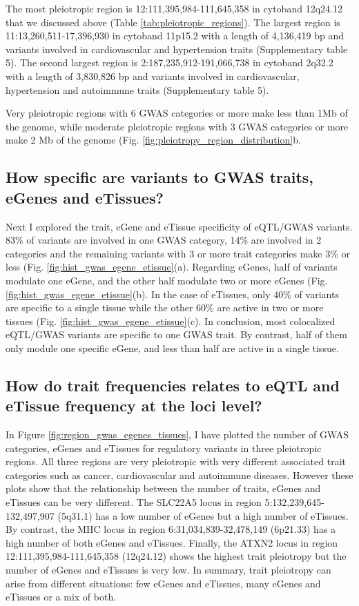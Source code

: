 The most pleiotropic region is 12:111,395,984-111,645,358 in cytoband 12q24.12 that we discussed above (Table \ref{tab:pleiotropic_regions}).
%
The largest region is 11:13,260,511-17,396,930 in cytoband 11p15.2 with a length of 4,136,419 bp and variants involved in cardiovascular and hypertension traits (Supplementary table 5).
%
The second largest region is 2:187,235,912-191,066,738 in cytoband 2q32.2 with a length of 3,830,826 bp and variants involved in cardiovascular, hypertension and autoimmune traits  (Supplementary table 5).

Very pleiotropic regions with 6 GWAS categories or more make less than 1Mb of the genome, while moderate pleiotropic regions with 3 GWAS categories or more make 2 Mb of the genome (Fig. \ref{fig:pleiotropy_region_distribution}b.

\subsection*{How specific are variants to GWAS traits, eGenes and eTissues?}

Next I explored the trait, eGene and eTissue specificity of eQTL/GWAS variants.
%
83\% of variants are involved in one GWAS category, 14\% are involved in 2 categories and the remaining variants with 3 or more trait categories make 3\% or less (Fig. \ref{fig:hist_gwas_egene_etissue}(a).
%
Regarding eGenes, half of variants modulate one eGene, and the other half modulate two or more eGenes (Fig. \ref{fig:hist_gwas_egene_etissue}(b).
%
In the case of eTissues, only 40\% of variants are specific to a single tissue while the other 60\% are active in two or more tissues (Fig. \ref{fig:hist_gwas_egene_etissue}(c).
%
In conclusion, most colocalized eQTL/GWAS variants are specific to one GWAS trait. By contrast, half of them only module one specific eGene, and less than half are active in a single tissue.

\subsection*{How do trait frequencies relates to eQTL and eTissue frequency at the loci level?}

In Figure \ref{fig:region_gwas_egenes_tissues}, I have plotted the number of GWAS categories, eGenes and eTissues for regulatory variants in three pleiotropic regions.
%
All three regions are very pleiotropic with very different associated trait categories such as cancer, cardiovascular and autoimmune diseases.
%
However these plots show that the relationship between the number of traits, eGenes and eTissues can be very different.
%
The SLC22A5 locus in region 5:132,239,645-132,497,907 (5q31.1) has a low number of eGenes but a high number of eTissues.
%
By contrast, the MHC locus in region 6:31,034,839-32,478,149 (6p21.33) has a high number of both eGenes and eTissues.
%
Finally, the ATXN2 locus in region 12:111,395,984-111,645,358 (12q24.12) shows the highest trait pleiotropy but the number of eGenes and eTissues is very low.
%
In summary, trait pleiotropy can arise from different situations: few eGenes and eTissues, many eGenes and eTissues or a mix of both.

